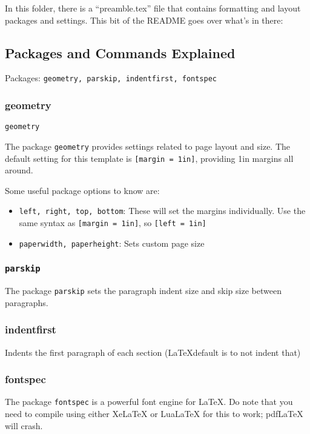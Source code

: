\documentclass{article}
\begin{document}
In this folder, there is a ``preamble.tex'' file that contains formatting and layout packages and settings. This bit of the README goes over what's in there: 


\subsection{Packages and Commands Explained}

Packages: \texttt{geometry, parskip, indentfirst, fontspec}

\subsubsection{geometry} \texttt{geometry}

    The package \texttt{geometry} provides settings related to page layout and size. The default setting for this template is \texttt{[margin = 1in]}, providing 1in margins all around. 

    Some useful package options to know are: 

    \begin{itemize}
        \item \texttt{left, right, top, bottom}: These will set the margins individually. Use the same syntax as \texttt{[margin = 1in]}, so \texttt{[left = 1in]}
        \item \texttt{paperwidth, paperheight}: Sets custom page size
    \end{itemize}

\subsubsection{\texttt{parskip}}

    The package \texttt{parskip} sets the paragraph indent size and skip size between paragraphs. 

\subsubsection{indentfirst}

    Indents the first paragraph of each section (\LaTeX default is to not indent that)

\subsubsection{fontspec}

    The package \texttt{fontspec} is a powerful font engine for \LaTeX. Do note that you need to compile using either XeLaTeX or LuaLaTeX for this to work; pdfLaTeX will crash. 
\end{document}
